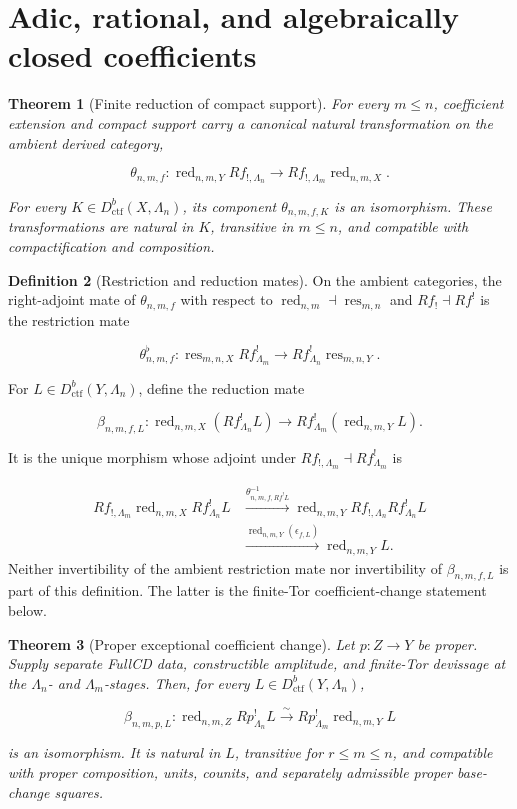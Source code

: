 \documentclass[10pt]{article}
\newtheorem{theorem}{Theorem}[section]
\theoremstyle{definition}
\newtheorem{definition}[theorem]{Definition}
\newcommand{\Dctf}{D^b_{\mathrm{ctf}}}
\newcommand{\red}{\operatorname{red}}
\begin{document}
\section{Adic, rational, and algebraically closed coefficients}

\begin{theorem}[Finite reduction of compact support]
For every \(m\leq n\), coefficient extension and compact support carry a
canonical natural transformation on the ambient derived category,

\[
 \theta_{n,m,f}:\red_{n,m,Y}Rf_{!,\Lambda_n}
 \longrightarrow Rf_{!,\Lambda_m}\red_{n,m,X}.
\]

For every \(K\in\Dctf(X,\Lambda_n)\), its component
\(\theta_{n,m,f,K}\) is an isomorphism.  These transformations are natural
in \(K\), transitive in \(m\leq n\), and compatible with compactification
and composition.
\end{theorem}

\begin{definition}[Restriction and reduction mates]
On the ambient categories, the right-adjoint mate of \(\theta_{n,m,f}\)
with respect to
\(\red_{n,m}\dashv\operatorname{res}_{m,n}\) and
\(Rf_!\dashv Rf^!\) is the restriction mate

\[
 \theta^\flat_{n,m,f}:
 \operatorname{res}_{m,n,X}Rf^!_{\Lambda_m}
 \longrightarrow Rf^!_{\Lambda_n}\operatorname{res}_{m,n,Y}.
\]

For \(L\in\Dctf(Y,\Lambda_n)\), define the reduction mate

\[
 \beta_{n,m,f,L}:\red_{n,m,X}(Rf^!_{\Lambda_n}L)
 \longrightarrow
 Rf^!_{\Lambda_m}(\red_{n,m,Y}L).
\]

It is the unique morphism whose adjoint under
\(Rf_{!,\Lambda_m}\dashv Rf^!_{\Lambda_m}\) is

\[
\begin{aligned}
 Rf_{!,\Lambda_m}\red_{n,m,X}Rf^!_{\Lambda_n}L
 &\xrightarrow{\theta_{n,m,f,Rf^!L}^{-1}}
 \red_{n,m,Y}Rf_{!,\Lambda_n}Rf^!_{\Lambda_n}L\\
 &\xrightarrow{\red_{n,m,Y}(\epsilon_{f,L})}
 \red_{n,m,Y}L.
\end{aligned}
\]
Neither invertibility of the ambient restriction mate nor invertibility of
\(\beta_{n,m,f,L}\) is part of this definition.  The latter is the
finite-Tor coefficient-change statement below.
\end{definition}

\begin{theorem}[Proper exceptional coefficient change]
Let \(p:Z\to Y\) be proper.  Supply separate FullCD data, constructible
amplitude, and finite-Tor devissage at the \(\Lambda_n\)- and
\(\Lambda_m\)-stages.  Then, for every
\(L\in\Dctf(Y,\Lambda_n)\),

\[
 \beta_{n,m,p,L}:\red_{n,m,Z}Rp^!_{\Lambda_n}L
 \xrightarrow{\sim}
 Rp^!_{\Lambda_m}\red_{n,m,Y}L
\]

is an isomorphism.  It is natural in \(L\), transitive for
\(r\leq m\leq n\), and compatible with proper composition, units, counits,
and separately admissible proper base-change squares.
\end{theorem}
\end{document}
